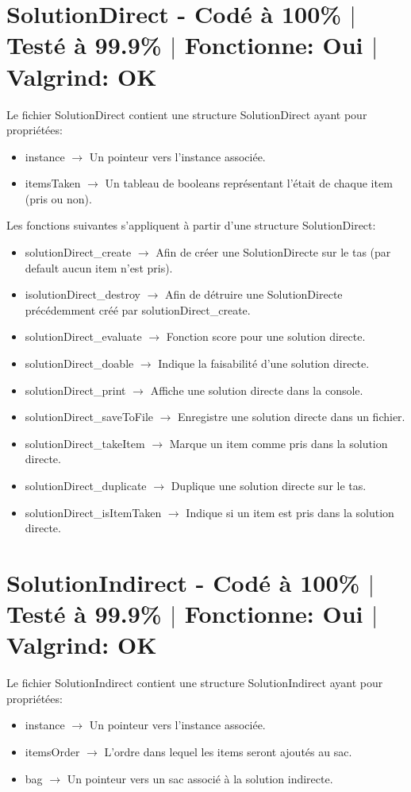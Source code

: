 \documentclass{EPUProjetPeiP}
\newcommand{\comp}[5]{
	\section[#1]{#1 {\small - Codé à #2\% $\vert$ Testé à #3\% $\vert$ Fonctionne: #4 $\vert$ Valgrind: #5}}
}
\begin{document}
\comp{SolutionDirect \label{sec:solutionDirect}}{100}{99.9}{Oui}{OK}
Le fichier SolutionDirect contient une structure SolutionDirect ayant pour propriétées:
\begin{itemize}
	\item instance $\longrightarrow$ Un pointeur vers l'instance associée.
	\item itemsTaken $\longrightarrow$ Un tableau de booleans représentant l'était de chaque item (pris ou non).\\
\end{itemize}

Les fonctions suivantes s'appliquent à partir d'une structure SolutionDirect:
\begin{itemize}
	\item solutionDirect\_create $\longrightarrow$ Afin de créer une SolutionDirecte sur le tas (par default aucun item n'est pris).
	\item isolutionDirect\_destroy $\longrightarrow$ Afin de détruire une SolutionDirecte précédemment créé par solutionDirect\_create.
	\item solutionDirect\_evaluate $\longrightarrow$ Fonction score pour une solution directe.
	\item solutionDirect\_doable $\longrightarrow$ Indique la faisabilité d'une solution directe.
	\item solutionDirect\_print $\longrightarrow$ Affiche une solution directe dans la console.
	\item solutionDirect\_saveToFile $\longrightarrow$ Enregistre une solution directe dans un fichier.
	\item solutionDirect\_takeItem $\longrightarrow$ Marque un item comme pris dans la solution directe.
	\item solutionDirect\_duplicate $\longrightarrow$ Duplique une solution directe sur le tas.
	\item solutionDirect\_isItemTaken $\longrightarrow$ Indique si un item est pris dans la solution directe.
\end{itemize}

\comp{SolutionIndirect}{100}{99.9}{Oui}{OK}
Le fichier SolutionIndirect contient une structure SolutionIndirect ayant pour propriétées:
\begin{itemize}
	\item instance $\longrightarrow$ Un pointeur vers l'instance associée.
	\item itemsOrder $\longrightarrow$ L'ordre dans lequel les items seront ajoutés au sac.
	\item bag $\longrightarrow$ Un pointeur vers un sac associé à la solution indirecte.\\
\end{itemize}
\end{document}
